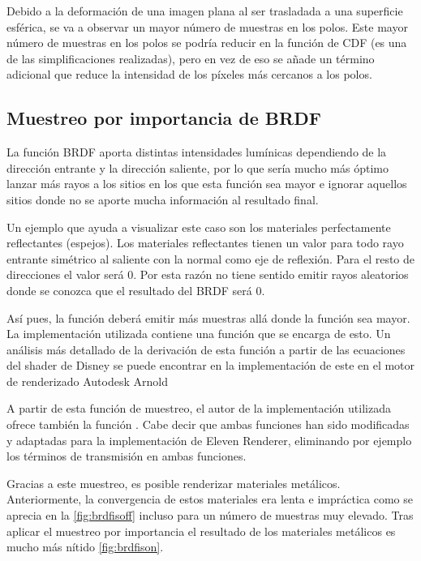 Debido a la deformación de una imagen plana al ser trasladada a una superficie esférica, se va a observar un mayor número de muestras en los polos. Este mayor número de muestras en los polos se podría reducir en la función de CDF (es una de las simplificaciones realizadas), pero en vez de eso se añade un término adicional  que reduce la intensidad de los píxeles más cercanos a los polos.


\subsection{Muestreo por importancia de BRDF}

La función BRDF aporta distintas intensidades lumínicas dependiendo de la dirección entrante y la dirección saliente, por lo que sería mucho más óptimo lanzar más rayos a los sitios en los que esta función sea mayor e ignorar aquellos sitios donde no se aporte mucha información al resultado final.

Un ejemplo que ayuda a visualizar este caso son los materiales perfectamente reflectantes (espejos). Los materiales reflectantes tienen un valor  para todo rayo entrante simétrico al saliente con la normal como eje de reflexión. Para el resto de direcciones el valor será 0. Por esta razón no tiene sentido emitir rayos aleatorios donde se conozca que el resultado del BRDF será 0.

Así pues, la función  deberá emitir más muestras allá donde la función  sea mayor. La implementación utilizada contiene una función  que se encarga de esto. Un análisis más detallado de la derivación de esta función a partir de las ecuaciones del shader de Disney se puede encontrar en la implementación de este en el motor de renderizado Autodesk Arnold \cite{arnoldimplementation}

A partir de esta función de muestreo, el autor de la implementación utilizada ofrece también la función . Cabe decir que ambas funciones han sido modificadas y adaptadas para la implementación de Eleven Renderer, eliminando por ejemplo los términos de transmisión en ambas funciones.

Gracias a este muestreo, es posible renderizar materiales metálicos. Anteriormente, la convergencia de estos materiales era lenta e impráctica como se aprecia en la \autoref{fig:brdfisoff} incluso para un número de muestras muy elevado. Tras aplicar el muestreo por importancia el resultado de los materiales metálicos es mucho más nítido \autoref{fig:brdfison}.

